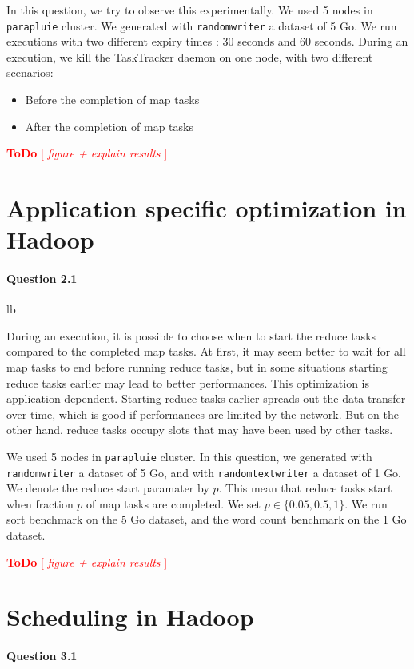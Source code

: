 \documentclass[a4paper]{article}
\newcommand{\todo}[1]{\textcolor{red}{\textbf{ToDo} [ \emph{#1} ]}}
\begin{document}
In this question, we try to observe this experimentally.
We used 5 nodes in \texttt{parapluie} cluster.
We generated with \texttt{randomwriter} a dataset of 5 Go.
We run executions with two different expiry times : 30 seconds and 60 seconds.
During an execution, we kill the TaskTracker daemon on one node, with two different scenarios:
\begin{itemize}
    \item Before the completion of map tasks
    \item After the completion of map tasks
\end{itemize}

\todo{ figure + explain results }



\section{Application specific optimization in Hadoop}

\paragraph{Question 2.1}lb

During an execution, it is possible to choose when to start the reduce tasks compared to the completed map tasks.
At first, it may seem better to wait for all map tasks to end before running reduce tasks,
but in some situations starting reduce tasks earlier may lead to better performances.
This optimization is application dependent.
Starting reduce tasks earlier spreads out the data transfer over time, which is good if performances are limited by the network.
But on the other hand, reduce tasks occupy slots that may have been used by other tasks.

We used 5 nodes in \texttt{parapluie} cluster.
In this question, we generated with \texttt{randomwriter} a dataset of 5 Go, and with \texttt{randomtextwriter} a dataset of 1 Go.
We denote the reduce start paramater by $p$.
This mean that reduce tasks start when fraction $p$ of map tasks are completed.
We set $p \in \lbrace 0.05, 0.5, 1 \rbrace$.
We run sort benchmark on the 5 Go dataset, and the word count benchmark on the 1 Go dataset.

\todo{ figure + explain results }

\section{Scheduling in Hadoop}

\paragraph{Question 3.1}
\end{document}
